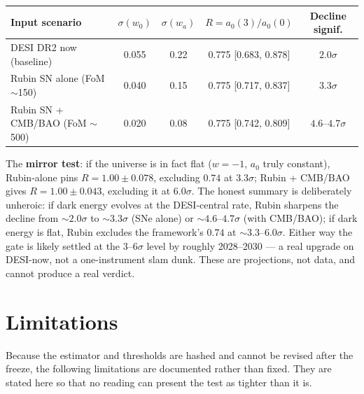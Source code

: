 \documentclass[11pt,a4paper]{article}
\newcommand{\azero}{a_0}
\begin{document}
\begin{center}
\begin{tabular}{lcccc}
\toprule
Input scenario & $\sigma(w_0)$ & $\sigma(w_a)$ & $R=\azero(3)/\azero(0)$ & Decline signif.\\
\midrule
DESI DR2 now (baseline) & 0.055 & 0.22 & 0.775 [0.683, 0.878] & $2.0\sigma$\\
Rubin SN alone (FoM $\sim$150) & 0.040 & 0.15 & 0.775 [0.717, 0.837] & $3.3\sigma$\\
Rubin SN + CMB/BAO (FoM $\sim$500) & 0.020 & 0.08 & 0.775 [0.742, 0.809] & $4.6$--$4.7\sigma$\\
\bottomrule
\end{tabular}
\end{center}

The \textbf{mirror test}: if the universe is in fact flat ($w=-1$, $\azero$
truly constant), Rubin-alone pins $R=1.00\pm0.078$, excluding $0.74$ at
$3.3\sigma$; Rubin + CMB/BAO gives $R=1.00\pm0.043$, excluding it at
$6.0\sigma$. The honest summary is deliberately unheroic: if dark energy
evolves at the DESI-central rate, Rubin sharpens the decline from
$\sim2.0\sigma$ to $\sim3.3\sigma$ (SNe alone) or $\sim4.6$--$4.7\sigma$ (with
CMB/BAO); if dark energy is flat, Rubin excludes the framework's $0.74$ at
$\sim3.3$--$6.0\sigma$. Either way the gate is likely settled at the
$3$--$6\sigma$ level by roughly 2028--2030 --- a real upgrade on DESI-now, not
a one-instrument slam dunk. These are projections, not data, and cannot
produce a real verdict.

\section{Limitations}
\label{sec:limitations}

Because the estimator and thresholds are hashed and cannot be revised after
the freeze, the following limitations are documented rather than fixed. They
are stated here so that no reading can present the test as tighter than it is.
\end{document}
